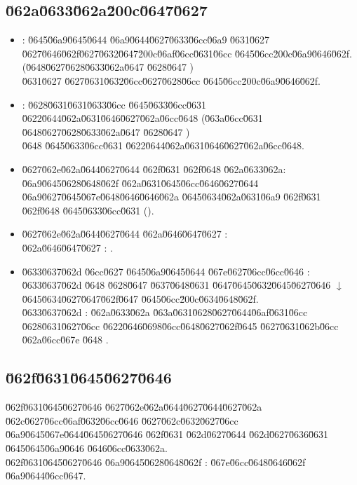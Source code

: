 \documentclass[12pt,a4paper]{article}
\begin{document}
\subsection*{\u062a\u0633\u062a\u200c\u0647\u0627}
\begin{itemize}
\item {}: \u0645\u06a9\u0645\u0644 \u06a9\u0644\u0627\u0633\u06cc\u06a9 \u0631\u0627 \u0627\u0646\u062f\u0627\u0632\u0647\u200c\u06af\u06cc\u0631\u06cc \u0645\u06cc\u200c\u06a9\u0646\u062f. (\u0648\u0627\u0628\u0633\u062a\u0647 \u0628\u0647 ) \\
 \u0631\u0627 \u0627\u0631\u0632\u06cc\u0627\u0628\u06cc \u0645\u06cc\u200c\u06a9\u0646\u062f.
\item {}: \u0628\u0631\u0631\u0633\u06cc \u0645\u0633\u06cc\u0631 \u0622\u0644\u062a\u0631\u0646\u0627\u062a\u06cc\u0648 (\u063a\u06cc\u0631 \u0648\u0627\u0628\u0633\u062a\u0647 \u0628\u0647 ) \\
 \u0648 \u0645\u0633\u06cc\u0631 \u0622\u0644\u062a\u0631\u0646\u0627\u062a\u06cc\u0648.
\item \u0627\u062e\u062a\u0644\u0627\u0644 \u062f\u0631 \u062f\u0648 \u062a\u0633\u062a: \u06a9\u0645\u0628\u0648\u062f \u062a\u0631\u0645\u06cc\u0646\u0627\u0644 \u06a9\u0627\u0645\u067e\u0648\u0646\u0646\u062a \u0645\u0634\u062a\u0631\u06a9 \u062f\u0631 \u062f\u0648 \u0645\u0633\u06cc\u0631 ().
\item \u0627\u062e\u062a\u0644\u0627\u0644 \u062a\u0646\u0647\u0627 :  \\
\u062a\u0646\u0647\u0627 : .
\item \u0633\u0637\u062d \u06cc\u0627 \u0645\u06a9\u0645\u0644 \u067e\u0627\u06cc\u06cc\u0646 : \u0633\u0637\u062d  \u0648  \u0628\u0647 \u0637\u0648\u0631 \u0647\u0645\u0632\u0645\u0627\u0646 $\downarrow$ \u0645\u0634\u0627\u0647\u062f\u0647 \u0645\u06cc\u200c\u0634\u0648\u062f. \\
\u0633\u0637\u062d : \u062a\u0633\u062a \u063a\u0631\u0628\u0627\u0644\u06af\u0631\u06cc \u0628\u0631\u0627\u06cc \u0622\u0646\u0698\u06cc\u0648\u0627\u062f\u0645 \u0627\u0631\u062b\u06cc \u062a\u06cc\u067e  \u0648 .
\end{itemize}

\subsection*{\u062f\u0631\u0645\u0627\u0646}
\u062f\u0631\u0645\u0627\u0646 \u0627\u062e\u062a\u0644\u0627\u0644\u0627\u062a \u062c\u0627\u06cc\u06af\u0632\u06cc\u0646 \u0627\u062c\u0632\u0627\u06cc \u06a9\u0645\u067e\u0644\u0645\u0627\u0646 \u062f\u0631 \u062d\u0627\u0644 \u062d\u0627\u0636\u0631 \u0645\u0645\u06a9\u0646 \u0646\u06cc\u0633\u062a. \\
\u062f\u0631\u0645\u0627\u0646 \u06a9\u0645\u0628\u0648\u062f : \u067e\u06cc\u0648\u0646\u062f \u06a9\u0644\u06cc\u0647.
\end{document}
